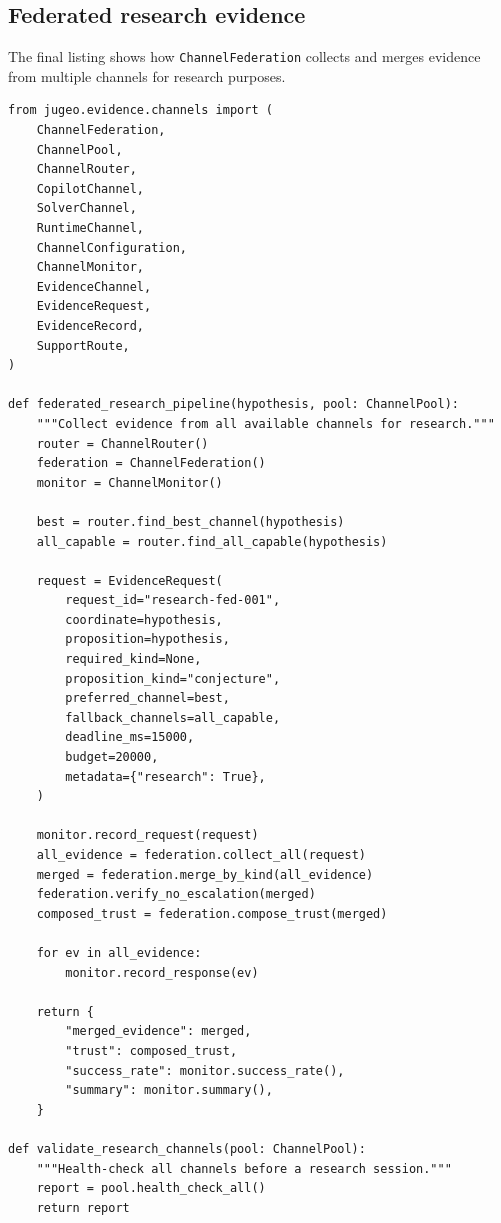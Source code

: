 \documentclass[11pt]{article}
\begin{document}
\subsection{Federated research evidence}

The final listing shows how \texttt{ChannelFederation}
collects and merges evidence from multiple channels
for research purposes.

\begin{lstlisting}[style=jugeo-python,
  caption={Federated research evidence collection},
  label={lst:federation}]
from jugeo.evidence.channels import (
    ChannelFederation,
    ChannelPool,
    ChannelRouter,
    CopilotChannel,
    SolverChannel,
    RuntimeChannel,
    ChannelConfiguration,
    ChannelMonitor,
    EvidenceChannel,
    EvidenceRequest,
    EvidenceRecord,
    SupportRoute,
)

def federated_research_pipeline(hypothesis, pool: ChannelPool):
    """Collect evidence from all available channels for research."""
    router = ChannelRouter()
    federation = ChannelFederation()
    monitor = ChannelMonitor()

    best = router.find_best_channel(hypothesis)
    all_capable = router.find_all_capable(hypothesis)

    request = EvidenceRequest(
        request_id="research-fed-001",
        coordinate=hypothesis,
        proposition=hypothesis,
        required_kind=None,
        proposition_kind="conjecture",
        preferred_channel=best,
        fallback_channels=all_capable,
        deadline_ms=15000,
        budget=20000,
        metadata={"research": True},
    )

    monitor.record_request(request)
    all_evidence = federation.collect_all(request)
    merged = federation.merge_by_kind(all_evidence)
    federation.verify_no_escalation(merged)
    composed_trust = federation.compose_trust(merged)

    for ev in all_evidence:
        monitor.record_response(ev)

    return {
        "merged_evidence": merged,
        "trust": composed_trust,
        "success_rate": monitor.success_rate(),
        "summary": monitor.summary(),
    }

def validate_research_channels(pool: ChannelPool):
    """Health-check all channels before a research session."""
    report = pool.health_check_all()
    return report
\end{lstlisting}

\end{document}
